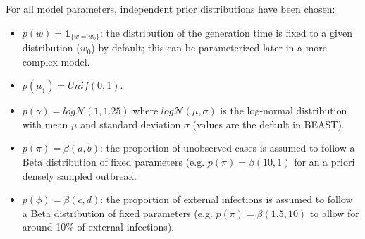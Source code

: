 \documentclass[10pt]{article}
\begin{document}
For all model parameters, independent prior distributions have been chosen:
\begin{itemize}
	\item $p(w) = \mathbf{1}_{\{w=w_0\}}$: the distribution of the generation time is fixed to a given distribution ($w_0$) by default; this can be parameterized later in a more complex model.
	\item $p(\mu_1) = Unif(0,1)$.
	\item $p(\gamma) = log\mathcal{N}(1,1.25)$ where $log\mathcal{N}(\mu,\sigma)$ is the log-normal distribution with mean $\mu$ and standard deviation $\sigma$ (values are the default in BEAST).
	\item $p(\pi) = \beta(a,b)$: the proportion of unobserved cases is assumed to follow a Beta distribution of fixed parameters (e.g. $p(\pi) = \beta(10,1)$ for an a priori densely sampled outbreak.
	\item $p(\phi) = \beta(c,d)$: the proportion of external infections is assumed to follow a Beta distribution of fixed parameters (e.g. $p(\pi) = \beta(1.5,10)$ to allow for around 10\% of external infections).	
\end{itemize}


\end{document}
